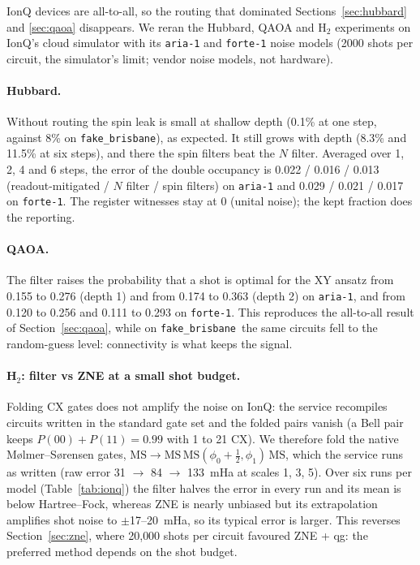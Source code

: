 \documentclass[11pt]{article}
\newcommand{\fb}{\texttt{fake\_brisbane}}
\begin{document}
IonQ devices are all-to-all, so the routing that dominated Sections~\ref{sec:hubbard} and \ref{sec:qaoa}
disappears. We reran the Hubbard, QAOA and H$_2$ experiments on IonQ's cloud simulator with its
\texttt{aria-1} and \texttt{forte-1} noise models (2000 shots per circuit, the simulator's limit; vendor
noise models, not hardware).

\paragraph{Hubbard.} Without routing the spin leak is small at shallow depth (0.1\% at one step, against
8\% on \fb), as expected. It still grows with depth (8.3\% and 11.5\% at six steps), and there the spin
filters beat the $N$ filter. Averaged over 1, 2, 4 and 6 steps, the error of the double occupancy is
0.022 / 0.016 / 0.013 (readout-mitigated / $N$ filter / spin filters) on \texttt{aria-1} and 0.029 /
0.021 / 0.017 on \texttt{forte-1}. The register witnesses stay at 0 (unital noise); the kept fraction
does the reporting.

\paragraph{QAOA.} The filter raises the probability that a shot is optimal for the XY ansatz from 0.155
to 0.276 (depth 1) and from 0.174 to 0.363 (depth 2) on \texttt{aria-1}, and from 0.120 to 0.256 and
0.111 to 0.293 on \texttt{forte-1}. This reproduces the all-to-all result of Section~\ref{sec:qaoa},
while on \fb\ the same circuits fell to the random-guess level: connectivity is what keeps the signal.

\paragraph{H$_2$: filter vs ZNE at a small shot budget.} Folding CX gates does not amplify the noise
on IonQ: the service recompiles circuits written in the standard gate set and the folded pairs vanish (a
Bell pair keeps $P(00)+P(11)=0.99$ with 1 to 21 CX). We therefore fold the native M{\o}lmer--S{\o}rensen
gates, $\mathrm{MS}\to\mathrm{MS}\,\mathrm{MS}(\phi_0+\tfrac12,\phi_1)\,\mathrm{MS}$, which the service
runs as written (raw error 31 $\to$ 84 $\to$ 133~mHa at scales 1, 3, 5). Over six runs per model
(Table~\ref{tab:ionq}) the filter halves the error in every run and its mean is below Hartree--Fock,
whereas ZNE is nearly unbiased but its extrapolation amplifies shot noise to $\pm$17--20~mHa, so its
typical error is larger. This reverses Section~\ref{sec:zne}, where 20{,}000 shots per circuit favoured
ZNE + qg: the preferred method depends on the shot budget.
\end{document}
